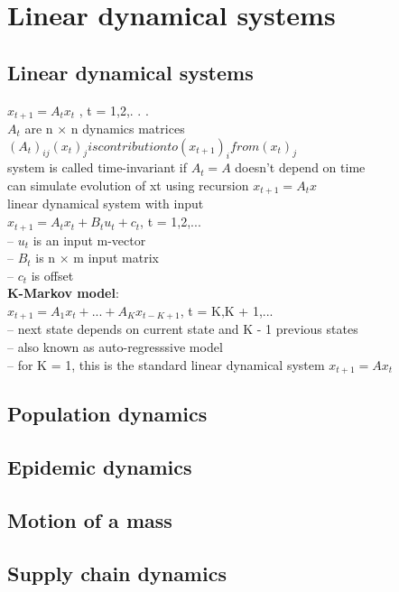 \section{Linear dynamical systems}
\subsection{Linear dynamical systems}
$x_{t+1} = A_tx_t$ , t = 1,2,. . .\\
\textbullet $A_t$ are n × n dynamics matrices
\textbullet $(A_t)_{ij}(x_t)_j
is contribution to (x_{t+1})_i
from (x_t)_j$\\
\textbullet system is called time-invariant if $A_t = A$ doesn't depend on time\\
\textbullet can simulate evolution of xt using recursion $x_{t+1} = A_tx$\\
\textbullet linear dynamical system with input\\
$x_{t+1} = A_tx_t + B_tu_t + c_t$, t = 1,2,...\\
\thickspace -- $u_t$ is an input m-vector\\
\thickspace -- $B_t$ is n × m input matrix\\
\thickspace -- $c_t$ is offset\\
\textbf{K-Markov model}:\\
$x_{t+1} = A_1x_t + ... + A_Kx_{t-K+1}$, t = K,K + 1,...\\
\thickspace -- next state depends on current state and K - 1 previous states\\
\thickspace – also known as auto-regresssive model\\
\thickspace – for K = 1, this is the standard linear dynamical system $x_{t+1} = Ax_t$\\
\subsection{Population dynamics}

\subsection{Epidemic dynamics}
\subsection{Motion of a mass}
\subsection{Supply chain dynamics}